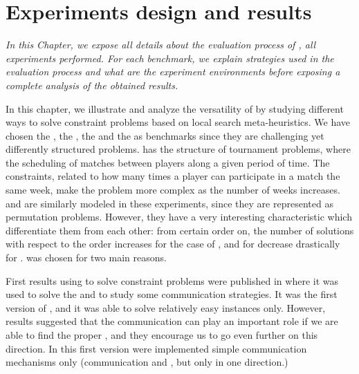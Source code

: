 \chapter{Experiments design and results}
\label{chap:expe}
\textit{In this Chapter, we expose all details about the evaluation process of \posl{}, \ie all experiments performed. For each benchmark, we explain strategies used in the evaluation process and what are the experiment environments before exposing a complete analysis of the obtained results.}
\vfill
\minitoc
\newpage

In this chapter, we illustrate and analyze the versatility of \posl{} by studying different ways to solve constraint problems based on local search meta-heuristics. 
We have chosen the \sgp, the \nqp, the \carrp{} and the \grp{} as benchmarks since they are challenging yet differently structured problems. 
\sgp{} has the structure of tournament problems, where the scheduling of matches between players along a given period of time. The constraints, related to how many times a player can participate in a match the same week, make the problem more complex as the number of weeks increases. \nq{} and \carr{} are similarly modeled in these experiments, since they are represented as permutation problems. However, they have a very interesting characteristic which differentiate them from each other: from certain order on, the number of solutions with respect to the order increases for the case of \nqp{}, and for decrease drastically for \carrp{}. \grp{} was chosen for two main reasons. 


First results using \posl{} to solve constraint problems were published in \cite{Reyes-amaro} where it was used to solve the \sgp{} and to study some communication strategies. It was the first version of \posl{}, and it was able to solve relatively easy instances only. However, results suggested that the communication can play an important role if we are able to find the proper \commstr{}, and they encourage us to go even further on this direction. In this first version were implemented simple communication mechanisms only (communication \oneTone{} and \oneTn{}, but only in one direction.)

